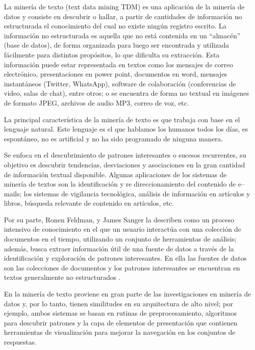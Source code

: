 La minería de texto (text data mining TDM) es una aplicación de la minería de datos \cite{Hearts2013} y
consiste en descubrir o hallar, a partir de cantidades de información no estructurada el conocimiento del
cual no existe ningún registro escrito. La información no estructurada es aquella que no está contenida
en un “almacén” (base de datos), de forma organizada para luego ser encontrada y utilizada fácilmente
para distintos propósitos, lo que dificulta su extracción. Esta información puede estar representada en
textos como los mensajes de correo electrónico, presentaciones en power point, documentos en word,
mensajes instantáneos (Twitter, WhatsApp), software de colaboración (conferencias de video, salas de
chat), entre otros; o se encuentra de forma no textual en imágenes de formato JPEG, archivos de audio
MP3, correo de voz, etc. 

La principal característica de la minería de texto es que trabaja con base en el lenguaje natural. Este
lenguaje es el que hablamos los humanos todos los días, es espontáneo, no es artificial y no ha sido
programado de ninguna manera.

Se enfoca en el descubrimiento de patrones interesantes o sucesos recurrentes, su objetivo es descubrir
tendencias, desviaciones y asociaciones en la gran cantidad de información textual disponible. Algunas
aplicaciones de los sistemas de minería de textos son la identificación y re direccionamiento del
contenido de e–mails; los sistemas de vigilancia tecnológica, análisis de información en artículos y libros,
búsqueda relevante de contenido en artículos, etc.

Por su parte, Ronen Feldman, y James Sanger la describen como un proceso intensivo de conocimiento
en el que un usuario interactúa con una colección de documentos en el tiempo, utilizando un conjunto
de herramientas de análisis; además, busca extraer información útil de una fuente de datos a través de la 
identificación y exploración de patrones interesantes. En ella las fuentes de datos son las colecciones de documentos y
los patrones interesantes se encuentran en textos generalmente no estructurados \cite{feldman2007advanced}.

En \cite{viera2017tecnicas} la minería de texto proviene en gran parte de las investigaciones en minería de datos y,
por lo tanto, tienen similitudes en su arquitectura de alto nivel; por ejemplo, 
ambos sistemas se basan en rutinas de preprocesamiento, algoritmos para descubrir patrones 
y la capa de elementos de presentación que contienen herramientas
de visualización para mejorar la navegación en los conjuntos de respuestas.


